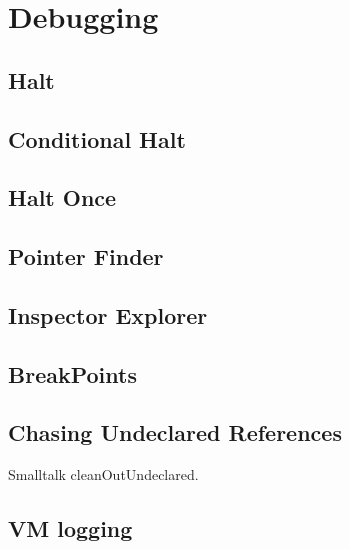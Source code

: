 \documentclass[a4paper,10pt,twoside]{book}
\begin{document}
\fi
\sloppy
\chapter{Debugging }\label{cha:basic}




\section{Halt}

\section{Conditional Halt}



\section{Halt Once}

\section{Pointer Finder}

\section{Inspector Explorer}


\section{BreakPoints}

\section{Chasing Undeclared References}
Smalltalk cleanOutUndeclared. 

\section{VM logging}





\ifx\wholebook\relax\else
\end{document}
